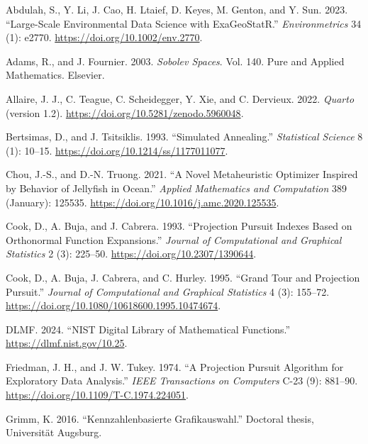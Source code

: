 \documentclass[
  12pt,
]{interact}
\newlength{\cslhangindent}
\newenvironment{CSLReferences}[2] %
 {\begin{list}{}{%
  \setlength{\itemindent}{0pt}
  \setlength{\leftmargin}{0pt}
  \setlength{\parsep}{0pt}
  \ifodd #1
   \setlength{\leftmargin}{\cslhangindent}
   \setlength{\itemindent}{-1\cslhangindent}
  \fi
  \setlength{\itemsep}{#2\baselineskip}}}
 {\end{list}}
\theoremstyle{plain}
\begin{document}
\label{refs}
\begin{CSLReferences}{1}{0}
Abdulah, S., Y. Li, J. Cao, H. Ltaief, D. Keyes, M. Genton, and Y. Sun.
2023. {``Large-Scale Environmental Data Science with {ExaGeoStatR}.''}
\emph{Environmetrics} 34 (1): e2770.
\url{https://doi.org/10.1002/env.2770}.

Adams, R., and J. Fournier. 2003. \emph{Sobolev Spaces}. Vol. 140. Pure
and Applied Mathematics. Elsevier.

Allaire, J. J., C. Teague, C. Scheidegger, Y. Xie, and C. Dervieux.
2022. \emph{{Quarto}} (version 1.2).
\url{https://doi.org/10.5281/zenodo.5960048}.

Bertsimas, D., and J. Tsitsiklis. 1993. {``Simulated Annealing.''}
\emph{Statistical Science} 8 (1): 10--15.
\url{https://doi.org/10.1214/ss/1177011077}.

Chou, J.-S., and D.-N. Truong. 2021. {``A Novel Metaheuristic Optimizer
Inspired by Behavior of Jellyfish in Ocean.''} \emph{Applied Mathematics
and Computation} 389 (January): 125535.
\url{https://doi.org/10.1016/j.amc.2020.125535}.

Cook, D., A. Buja, and J. Cabrera. 1993. {``Projection Pursuit Indexes
Based on Orthonormal Function Expansions.''} \emph{Journal of
Computational and Graphical Statistics} 2 (3): 225--50.
\url{https://doi.org/10.2307/1390644}.

Cook, D., A. Buja, J. Cabrera, and C. Hurley. 1995. {``Grand Tour and
Projection Pursuit.''} \emph{Journal of Computational and Graphical
Statistics} 4 (3): 155--72.
\url{https://doi.org/10.1080/10618600.1995.10474674}.

DLMF. 2024. {``{NIST Digital Library of Mathematical Functions}.''}
\url{https://dlmf.nist.gov/10.25}.

Friedman, J. H., and J. W. Tukey. 1974. {``A Projection Pursuit
Algorithm for Exploratory Data Analysis.''} \emph{IEEE Transactions on
Computers} C-23 (9): 881--90.
\url{https://doi.org/10.1109/T-C.1974.224051}.

Grimm, K. 2016. {``Kennzahlenbasierte Grafikauswahl.''} Doctoral thesis,
Universität Augsburg.


\end{CSLReferences}
\end{document}
